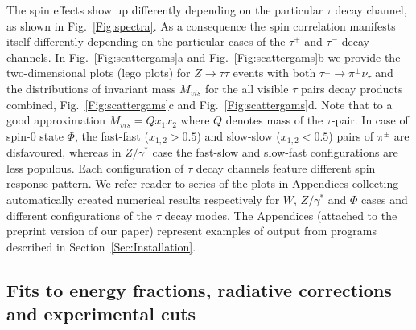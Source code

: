 \documentclass{article}
\begin{document}
The spin effects show up differently depending on the particular $\tau$ decay channel,
as shown in Fig.~\ref{Fig:spectra}. As a consequence the spin correlation manifests itself differently 
depending on the particular cases of the  $\tau^+$ and $\tau^-$ decay channels.
In Fig.~\ref{Fig:scattergams}a and  Fig.~\ref{Fig:scattergams}b we provide 
the two-dimensional plots (lego plots) for $Z \to \tau \tau$ events with both  $\tau^{\pm} \rightarrow \pi^\pm \nu_\tau$
and the distributions of invariant mass $M_{vis}$ for the all visible  $\tau$ pairs decay products
combined, Fig.~\ref{Fig:scattergams}c and  Fig.~\ref{Fig:scattergams}d.
Note that to a good approximation $M_{vis}=Q x_1 x_2$ where $Q$ denotes mass of the 
$\tau$-pair.
In case of spin-0 state $\Phi$,
the fast-fast ($x_{1,2} > 0.5$) and slow-slow ($x_{1,2} < 0.5$)
pairs of $\pi^\pm$ are disfavoured, whereas in $Z/\gamma^{*}$ case the fast-slow and
slow-fast configurations are less populous.
Each configuration of  $\tau$ decay channels feature different spin response pattern. 
We refer reader to series of the plots in Appendices
collecting automatically created numerical results respectively for 
$W$, $Z/\gamma^{*}$ and  $\Phi$ cases and different configurations of the $\tau$ decay modes. 
The Appendices (attached to the preprint version of our paper) represent
examples of output from programs described in Section~\ref{Sec:Installation}.

\subsection{Fits to energy fractions, radiative corrections and experimental cuts}
\label{subsec:cuts}
\end{document}
